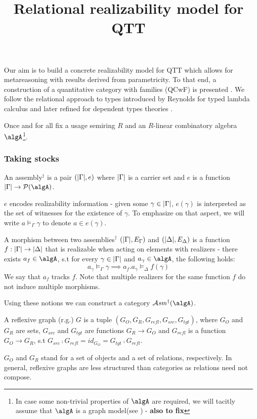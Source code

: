 \documentclass[12pt,a4paper]{article}
\title{\vspace{-5em} Relational realizability model for QTT}
\date{\vspace{-3em}}
\def\cAsm{\mathcal{A}\mathit{sm}^\dagger}
\def\src{_{src}}\alwaysmath{src}
\def\rfl{_{refl}}\alwaysmath{rfl}
\def\tgt{_{tgt}}\alwaysmath{tgt}
\renewcommand{\O}{_{O}}
\newcommand{\R}{\ensuremath{_{R}}}
\begin{document}
\maketitle

Our aim is to build a concrete realizability model for QTT which allows for metareasoning with results derived from parametricity. To that end, a construction of a quantitative category with families (QCwF) is presented \cite{Atkey2018}. We follow the relational approach to types introduced by Reynolds for typed lambda calculus \cite{Ma1992} and later refined for dependent types theories \cite{Atkey2014a}.


Once and for all fix a usage semiring $R$ and an $R$-linear combinatory algebra $\algA$\footnote{In case some non-trivial properties of $\algA$ are required, we will tacitly assume that $\algA$ is a graph model(see \cite{fill}) - \textbf{also to fix}}.

\subsubsection*{Taking stocks}
\begin{definition}
  An assembly$^\dagger$ \Gamma is a pair $(|\Gamma|, e)$ where $|\Gamma|$ is a carrier set and  $e$ is a function $\carr\Gamma \to \pow(\algA)$.
\end{definition}

$e$ encodes realizability information - given some $\gamma \in |\Gamma|$, $e(\gamma)$ is interpreted as the set of witnesses for the existence of $\gamma$. To emphasize on that aspect, we will write $a \vDash_\Gamma \gamma$ to denote $a \in e(\gamma)$.

A morphism between two assemblies$^\dagger$ $(|\Gamma|, E_\Gamma)$ and $(|\Delta|, E_\Delta)$ is a function $f : |\Gamma| \to |\Delta|$ that is realizable when acting on elements with realizers - there exists $a_f \in \algA$, s.t for every $\gamma \in |\Gamma|$ and $a_\gamma \in \algA$, the following holds:
$$ a_\gamma \vDash_\Gamma \gamma \implies a_f . a_\gamma \vDash_\Delta f(\gamma) $$
We say that $a_f$ tracks $f$. Note that multiple realizers for the same function $f$ do not induce multiple morphisms.

Using these notions we can construct a category $\cAsm(\algA)$.

\begin{definition}
  \label{def:refl-graph}
  A reflexive graph (r.g.) $G$ is a tuple $(G\O, G\R, G\rfl, G\src, G\tgt)$, where $G_O$ and $G_R$ are sets, $G\src$ and $G\tgt$ are functions $G\R \to G\O$ and $G\rfl$ is a function $G\O \to G\R$, s.t $G\src \comp G\rfl = id_{G\O} = G\tgt \comp G\rfl$.
\end{definition}
$G\O$ and $G\R$ stand for a set of objects and a set of relations, respectively. In general, reflexive graphs are less structured than categories as relations need not compose. \\
\end{document}
